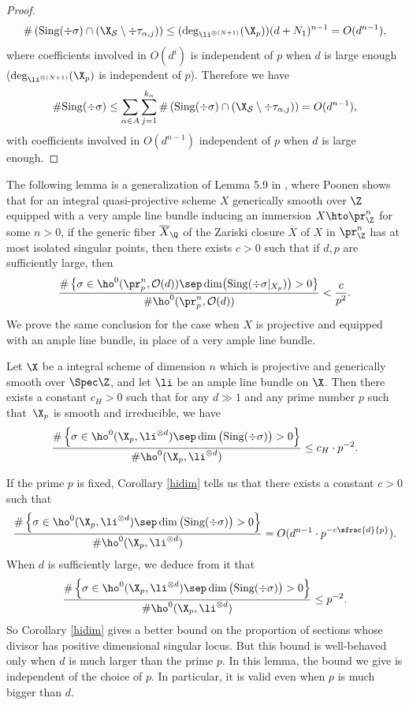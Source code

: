 \begin{proof}
\[
\#\left(\mathrm{Sing}(\div \sigma)\cap \left(\X_{\mathcal{S}}\setminus \div \tau_{\alpha,j}\right) \right)\leq (\deg_{\li^{\otimes (N+1)}}(\X_p))(d+N_1)^{n-1}=O(d^{n-1}),
\]
where coefficients involved in $O(d^i)$ is independent of $p$ when $d$ is large enough ($\deg_{\li^{\otimes (N+1)}}(\X_p)$ is independent of $p$). Therefore we have
\[
\# \mathrm{Sing}(\div \sigma) \leq \sum_{\alpha\in A}\sum_{j=1}^{k_{\alpha}} \#\left(\mathrm{Sing}(\div \sigma)\cap \left(\X_{\mathcal{S}}\setminus \div \tau_{\alpha,j}\right) \right)=O(d^{n-1}),
\]
with coefficients involved in $O(d^{n-1})$ independent of $p$ when $d$ is large enough.
\end{proof}

The following lemma is a generalization of Lemma 5.9 in \cite{Po04}, where Poonen shows that for an integral quasi-projective scheme $X$ generically smooth over $\Z$ equipped with a very ample line bundle inducing an immersion $X\hto \pr^n_{\Z}$ for some $n>0$, if the generic fiber $\overline{X}_{\Q}$ of the Zariski closure $\overline{X}$ of $X$ in $\pr^n_{\Z}$ has at most isolated singular points, then there exists $c>0$ such that if $d,p$ are sufficiently large, then
\[
\frac{\#\left\{ \sigma\in \ho^0(\pr^n_{p},\mathcal{O}(d)) \sep \dim\bigl(\mathrm{Sing}(\div \sigma|_{X_p})\bigr)>0 \right\}}{\#\ho^0(\pr^n_{p},\mathcal{O}(d))}<\frac{c}{p^2}.
\]
We prove the same conclusion for the case when $X$ is projective and equipped with an ample line bundle, in place of a very ample line bundle.
\begin{lem}\label{posdivsing}
Let $\X$ be a integral scheme of dimension $n$ which is projective and generically smooth over $\Spec \Z$, and let $\li$ be an ample line bundle on $\X$. Then there exists a constant $c_H>0$ such that for any $d\gg 1$ and any prime number $p$ such that~$\X_p$ is smooth and irreducible, we have
\[
\frac{\#\left\{ \sigma\in \ho^0(\X_p, \li^{\otimes d})\sep \dim\big(\mathrm{Sing(\div \sigma})\big)>0 \right\}}{\#\ho^0(\X_p, \li^{\otimes d})}\leq c_H\cdot p^{-2}.
\]
\end{lem}
\begin{rmq}
If the prime $p$ is fixed, Corollary \ref{hidim} tells us that there exists a constant $c>0$ such that
\[
\frac{\#\left\{ \sigma\in \ho^0(\X_p, \li^{\otimes d})\sep \dim\big(\mathrm{Sing(\div \sigma})\big)>0 \right\}}{\#\ho^0(\X_p, \li^{\otimes d})}=O(d^{n-1}\cdot p^{-c\sfrac{d}{p}}).
\]
When $d$ is sufficiently large, we deduce from it that
\[
\frac{\#\left\{ \sigma\in \ho^0(\X_p, \li^{\otimes d})\sep \dim\big(\mathrm{Sing(\div \sigma})\big)>0 \right\}}{\#\ho^0(\X_p, \li^{\otimes d})}\leq p^{-2}.
\]
So Corollary \ref{hidim} gives a better bound on the proportion of sections whose divisor has positive dimensional singular locus. But this bound is well-behaved only when $d$ is much larger than the prime $p$. In this lemma, the bound we give is independent of the choice of $p$. In particular, it is valid even when $p$ is much bigger than $d$.
\end{rmq}
